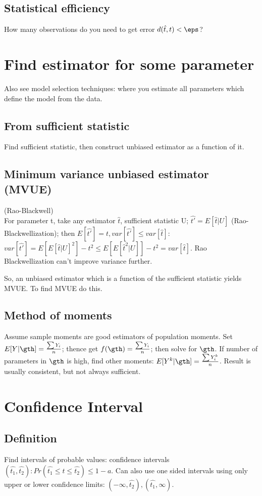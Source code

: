 \documentclass[oneside, article]{memoir}
\begin{document}
\subsection{Statistical efficiency}
How many observations do you need to get error $d(\hat{t}, t) < \eps$?

\section{Find estimator for some parameter}
Also see model selection techniques: where you estimate all parameters which define the model from the data.

\subsection{From sufficient statistic}
Find sufficient statistic, then construct unbiased estimator as a function of it.

\subsection{Minimum variance unbiased estimator (MVUE)}
(Rao-Blackwell)\\
For parameter t, take any estimator $\hat{t}$, sufficient statistic U; $\hat{t'} = E[\hat{t}|U]$ (Rao-Blackwellization); then $E[\hat{t'}] = t, var[\hat{t'}] \leq var[\hat{t}]$: $var[\hat{t'}] = E[E[\hat{t}|U]^{2}] - t^{2} \leq E[E[\hat{t}^{2}|U]] - t^{2} = var[\hat{t}]$. Rao Blackwellization can't improve variance further.

So, an unbiased estimator which is a function of the sufficient statistic yields MVUE. To find MVUE do this.

\subsection{Method of moments}
Assume sample moments are good estimators of population moments. Set $E[Y|\gth] = \frac{\sum Y_{i}}{n}$; thence get $f(\gth) = \frac{\sum Y_{i}}{n}$; then solve for $\gth$. If number of parameters in $\gth$ is high, find other moments: $E[Y^{k}|\gth] = \frac{\sum Y_{i}^{k}}{n}$. Result is usually consistent, but not always sufficient.


\section{Confidence Interval}
\subsection{Definition}
Find intervals of probable values: confidence intervals $(\hat{t_{1}}, \hat{t_{2}}): Pr(\hat{t_{1}} \leq t \leq \hat{t_{2}}) \leq 1-a$. Can also use one sided intervals using only upper or lower confidence limits: $(-\infty, \hat{t_{2}}), (\hat{t_{1}}, \infty)$.
\end{document}
